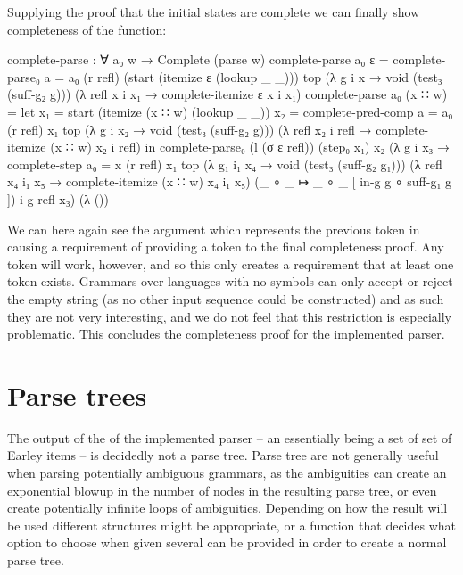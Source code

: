 		Supplying the proof that the initial states are complete we can finally
		show completeness of the  function:

		\begin{code}
			  complete-parse : ∀ a₀ w →
			    Complete (parse w)
			  complete-parse a₀ ε =
			    complete-parse₀ {a = a₀} (r refl) (start (itemize ε (lookup _ _))) top
			      (λ {g i x → void (test₃ (suff-g₂ g))})
			      (λ {refl x i x₁ → complete-itemize ε x i x₁})
			  complete-parse a₀ (x ∷ w) =
			    let
			      x₁ = start (itemize (x ∷ w) (lookup _ _)) 
			      x₂ = complete-pred-comp {a = a₀} (r refl) x₁ top
			        (λ {g i x₂ → void (test₃ (suff-g₂ g))})
			        (λ {refl x₂ i refl → complete-itemize (x ∷ w) x₂ i refl})
			    in
			    complete-parse₀ (l (σ ε refl)) (step₀ x₁) x₂
			      (λ g i x₃ → complete-step {a₀ = x} (r refl) x₁ top
			        (λ {g₁ i₁ x₄ → void (test₃ (suff-g₂ g₁))})
			        (λ {refl x₄ i₁ x₅ → complete-itemize (x ∷ w) x₄ i₁ x₅})
			        (_ ∘ _ ↦ _ ∘ _ [ in-g g ∘ suff-g₁ g ]) i g refl x₃)
			      (λ ())
		\end{code}

		We can here again see the argument  which represents the
		previous token in  causing a requirement of
		providing a token to the final completeness proof. Any token will work,
		however, and so this only creates a requirement that at least one token
		exists. Grammars over languages with no symbols can only accept or
		reject the empty string (as no other input sequence could be
		constructed) and as such they are not very interesting, and we do not
		feel that this restriction is especially problematic. This concludes
		the completeness proof for the implemented parser.

	\section{Parse trees}

		The output of the of the implemented parser -- an 
		essentially being a set of set of Earley items -- is decidedly not a
		parse tree.  Parse tree are not generally useful when parsing
		potentially ambiguous grammars, as the ambiguities can create an
		exponential blowup in the number of nodes in the resulting parse tree,
		or even create potentially infinite loops of ambiguities. Depending on
		how the result will be used different structures might be appropriate, 
		or a function that decides what option to choose when given several can 
		be provided in order to create a normal parse tree.

